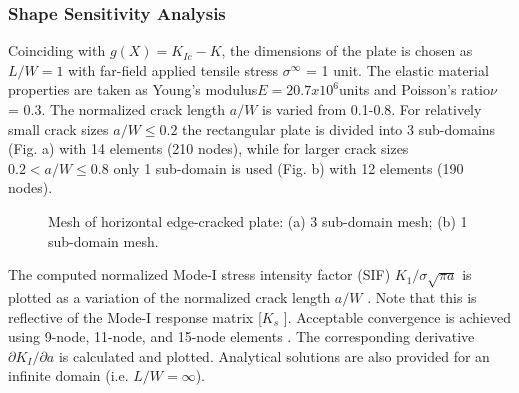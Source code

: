 \documentclass[12pt]{article}
\begin{document}
\subsubsection{Shape Sensitivity Analysis}
Coinciding with $g(X) = K_{Ic} - K$, the dimensions of the plate is chosen as $L/W = 1$ with far-field applied tensile stress $\sigma^\infty$ = 1 unit. The
elastic material properties are taken as Young’s modulus$ E = 20.7 x 10^6 $units and Poisson’s ratio$\nu$ = 0.3. The normalized
crack length $a/W$ is varied from 0.1-0.8. For relatively small crack sizes $a/W \le 0.2$ the rectangular plate is divided into 3
sub-domains (Fig. a) with 14 elements (210 nodes), while for larger crack sizes $0.2 < a/W \le 0.8$ only 1 sub-domain is used
(Fig. b) with 12 elements (190 nodes).

\begin{figure}[H]
    \centering
    \captionsetup{labelformat=empty}
    \caption{Mesh of horizontal edge-cracked plate: (a) 3 sub-domain mesh; (b) 1 sub-domain mesh.}  
\end{figure}
The computed normalized Mode-I stress intensity factor (SIF) $K_1/\sigma\sqrt{\pi a}$ is plotted as a variation of the normalized crack
length $a/W$ . Note that this is reflective of the Mode-I response matrix [$K_s$ ]. Acceptable convergence is achieved using
9-node, 11-node, and 15-node elements . The corresponding derivative $\partial K_I/\partial a$ is calculated and plotted. 
Analytical solutions are also provided for an infinite domain (i.e. $L/
W = \infty$).
\end{document}
